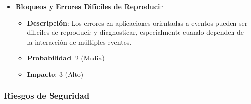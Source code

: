 \documentclass{article}
\begin{document}
\begin{itemize}
    \item \textbf{Bloqueos y Errores Difíciles de Reproducir}
          \begin{itemize}
              \item \textbf{Descripción}: Los errores en aplicaciones orientadas a eventos pueden ser difíciles de reproducir y diagnosticar, especialmente cuando dependen de la interacción de múltiples eventos.
              \item \textbf{Probabilidad}: 2 (Media)
              \item \textbf{Impacto}: 3 (Alto)
          \end{itemize}
\end{itemize}

\subsubsection{Riesgos de Seguridad}
\end{document}
